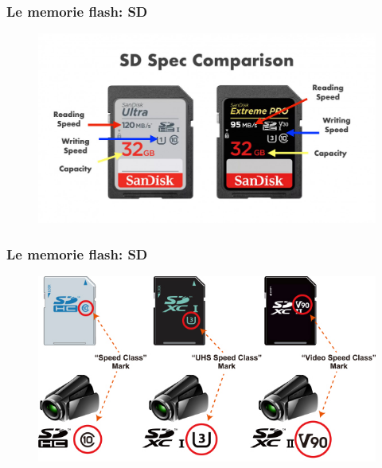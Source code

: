 \begin{frame}
	\frametitle{Le memorie flash: SD}
	
	\begin{figure}[!htbp]
		\centering
		\includegraphics[width=1.0\linewidth]{images/5_memory/flash_3.jpg}
	\end{figure}
\end{frame}

\begin{frame}
	\frametitle{Le memorie flash: SD}
	
	\begin{figure}[!htbp]
		\centering
		\includegraphics[width=1.0\linewidth]{images/5_memory/flash_4.jpg}
	\end{figure}
\end{frame}

